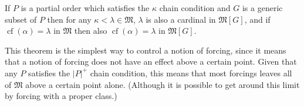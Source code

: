\documentclass[12pt]{article}
\begin{document}

If $P$ is a partial order which satisfies the $\kappa$ chain condition and $G$ is a generic subset of $P$ then for any $\kappa<\lambda\in\mathfrak{M}$, $\lambda$ is also a cardinal in $\mathfrak{M}[G]$, and if $\operatorname{cf}(\alpha)=\lambda$ in $\mathfrak{M}$ then also $\operatorname{cf}(\alpha)=\lambda$ in $\mathfrak{M}[G]$.

This theorem is the simplest way to control a notion of forcing, since it means that a notion of forcing does not have an effect above a certain point.  Given that any $P$ satisfies the $|P|^+$ chain condition, this means that most forcings leaves all of $\mathfrak{M}$ above a certain point alone.  (Although it is possible to get around this limit by forcing with a proper class.)
\end{document}
